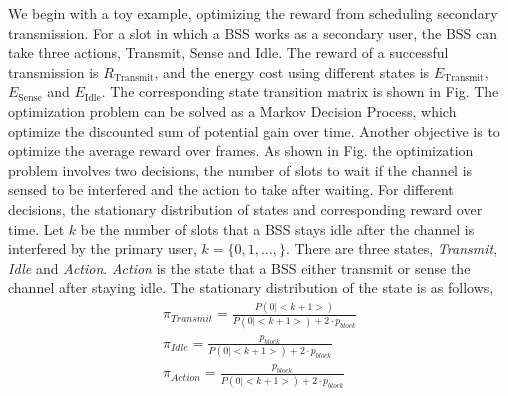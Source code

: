 \documentclass[10pt, conference, letterpaper]{IEEEtran}
\begin{document}
We begin with a toy example, optimizing the reward from scheduling secondary transmission. For a slot in which a BSS works as a secondary user, the BSS can take three actions, Transmit, Sense and Idle. The reward of a successful transmission is $R_{\text{Transmit}}$, and the energy cost using different states is $E_{\text{Transmit}}$, $E_{\text{Sense}}$ and $E_{\text{Idle}}$. The corresponding state transition matrix is shown in Fig. %
The optimization problem can be solved as a Markov Decision Process, which optimize the discounted sum of potential gain over time. 
Another objective is to optimize the average reward over frames. As shown in Fig. %
the optimization problem involves two decisions, the number of slots to wait if the channel is sensed to be interfered and the action to take after waiting. For different decisions, the stationary distribution of states and corresponding reward over time. Let $k$ be the number of slots that a BSS stays idle after the channel is interfered by the primary user, $k = \{0,1,\ldots, \}$. There are three states, \emph{Transmit}, \emph{Idle} and \emph{Action}. \emph{Action} is the state that a BSS either transmit or sense the channel after staying idle.
The stationary distribution of the state is as follows,
\begin{equation}%
\begin{split}
\pi_{Transmit} = \frac{P(0|<k+1>)}{P(0|<k+1>) + 2\cdot p_{block}} \\
\pi_{Idle} = \frac{p_{block}}{P(0|<k+1>) + 2\cdot p_{block}} \\
\pi_{Action} = \frac{p_{block}}{P(0|<k+1>) + 2\cdot p_{block}} 
\end{split}
\end{equation}
\end{document}
